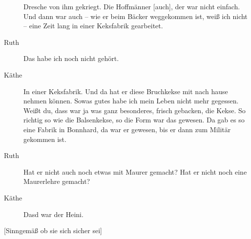 \documentclass[ngerman,]{article}
\begin{document}
\begin{multicols}{3}
\begin{description}
Dresche von ihm gekriegt. Die Hoffmänner {[}auch{]}, der war nicht
einfach. Und dann war auch – wie er beim Bäcker weggekommen ist, weiß
ich nicht – eine Zeit lang in einer Keksfabrik gearbeitet.
\item[Ruth]
Das habe ich noch nicht gehört.
\item[Käthe]
In einer Keksfabrik. Und da hat er diese Bruchkekse mit nach hause
nehmen können. Sowas gutes habe ich mein Leben nicht mehr gegessen.
Weißt du, dass war ja was ganz besonderes, frisch gebacken, die Kekse.
So richtig so wie die Balsenkekse, so die Form war das gewesen. Da gab
es so eine Fabrik in Bonnhard, da war er gewesen, bis er dann zum
Militär gekommen ist.
\item[Ruth]
Hat er nicht auch noch etwas mit Maurer gemacht? Hat er nicht noch eine
Maurerlehre gemacht?
\item[Käthe]
Dasd war der Heini.
\end{description}

{[}Sinngemäß ob sie sich sicher sei{]}


\end{multicols}
\end{document}
